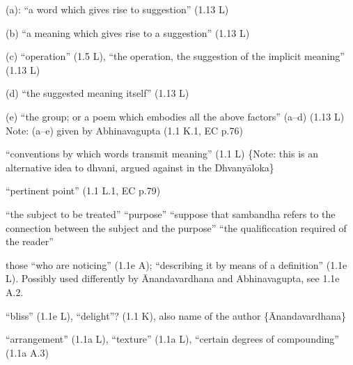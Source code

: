 \documentclass[10pt]{article}
\begin{document}
\begin{multicols}{2}
\begin{enumerate}[
			leftmargin=0em,
			rightmargin=0em,
		]
		 (a): ``a word which gives rise to suggestion'' (1.13 L)

		 (b) ``a meaning which gives rise to a suggestion'' (1.13 L)

		 (c) ``operation'' (1.5 L),
		``the operation, the suggestion of the implicit meaning'' (1.13 L)

		 (d) ``the suggested meaning itself'' (1.13 L)

		 (e) ``the group; or a poem which embodies all the above factors'' (a--d) (1.13 L) Note: (a--e) given by Abhinavagupta (1.1 K.1, EC p.76)

		  ``conventions by which words transmit meaning'' (1.1 L) \{Note: this is an alternative idea to dhvani, argued against in the Dhvanyāloka\}

		 ``pertinent point'' (1.1 L.1, EC p.79)
		\begin{enumerate}
			 ``the subject to be treated''
			 ``purpose''
			 ``suppose that sambandha refers to the connection between the subject and the purpose''
			 ``the qualificcation required of the reader''
		\end{enumerate}

		 those ``who are noticing'' (1.1e A); ``describing it by means of a definition'' (1.1e L). Possibly used differently by Ānandavardhana and Abhinavagupta, see 1.1e A.2.

		 ``bliss'' (1.1e L), ``delight''? (1.1 K), also name of the author \{Ānandavardhana\}

		 ``arrangement'' (1.1a L), ``texture'' (1.1a L), ``certain degrees of compounding'' (1.1a A.3)




\end{enumerate}
\end{multicols}
\end{document}
